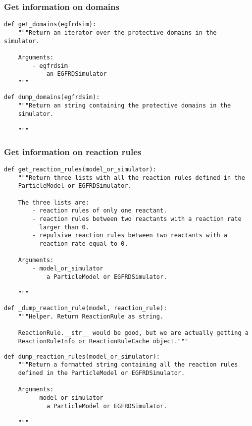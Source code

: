 \documentclass[a4paper,10pt]{article}
\begin{document}
\subsubsection{Get information on domains}

\begin{verbatim}
def get_domains(egfrdsim):
    """Return an iterator over the protective domains in the simulator.

    Arguments:
        - egfrdsim
            an EGFRDSimulator
    """
\end{verbatim}

\begin{verbatim}
def dump_domains(egfrdsim):
    """Return an string containing the protective domains in the 
    simulator.

    """
\end{verbatim}

\subsubsection{Get information on reaction rules}

\begin{verbatim}
def get_reaction_rules(model_or_simulator):
    """Return three lists with all the reaction rules defined in the 
    ParticleModel or EGFRDSimulator.

    The three lists are:
        - reaction rules of only one reactant.
        - reaction rules between two reactants with a reaction rate 
          larger than 0.
        - repulsive reaction rules between two reactants with a 
          reaction rate equal to 0.

    Arguments:
        - model_or_simulator
            a ParticleModel or EGFRDSimulator.

    """
\end{verbatim}

\begin{verbatim}
def _dump_reaction_rule(model, reaction_rule):
    """Helper. Return ReactionRule as string.

    ReactionRule.__str__ would be good, but we are actually getting a 
    ReactionRuleInfo or ReactionRuleCache object."""
\end{verbatim}

\begin{verbatim}
def dump_reaction_rules(model_or_simulator):
    """Return a formatted string containing all the reaction rules 
    defined in the ParticleModel or EGFRDSimulator.

    Arguments:
        - model_or_simulator
            a ParticleModel or EGFRDSimulator.

    """
\end{verbatim}
\end{document}
